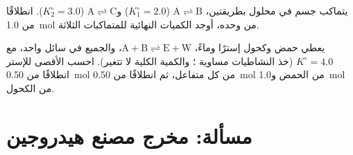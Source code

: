 \begin{exercise}[$\star\star\star$]\label{exo:b1:extent-q-and-k:11}
يتماكب جسم  في محلول بطريقتين، $\mathrm{A \rightleftharpoons B}$
($K_1^\circ = 2.0$) و$\mathrm{A \rightleftharpoons C}$ ($K_2^\circ = 3.0$). انطلاقًا من
\qty{1.0}{mol} من  وحده، أوجد الكميات النهائية للمتماكبات
الثلاثة.
\end{exercise}

\begin{exercise}[$\star\star\star$]\label{exo:b1:extent-q-and-k:12}
يعطي حمض  وكحول  إسترًا وماءً، $\mathrm{A + B
\rightleftharpoons E + W}$، والجميع في  سائل واحد، مع $K^\circ = 4.0$ (خذ
النشاطيات مساوية ؛ والكمية الكلية لا تتغير).
احسب  الأقصى للإستر انطلاقًا من \qty{0.50}{mol} من كل متفاعل،
ثم انطلاقًا من \qty{0.50}{mol} من الحمض و\qty{1.0}{mol} من الكحول.
\end{exercise}

\section{مسألة: مخرج مصنع هيدروجين}

